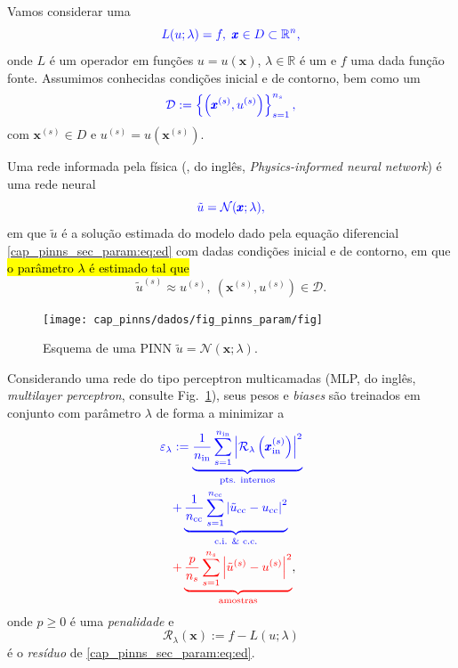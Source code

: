 Vamos considerar uma 
\begin{equation}\label{cap_pinns_sec_param:eq:ed}\color{blue}L(u;\lambda) = f, ~\pmb{x}\in D\subset\mathbb{R}^n,
\end{equation}
onde $L$ é um operador em funções $u = u(\pmb{x})$, $\lambda\in\mathbb{R}$ é um  e $f$ uma dada função fonte. Assumimos conhecidas condições inicial e de contorno, bem como um 
\begin{equation}\color{blue}\mathcal{D} := \left\{\left(\pmb{x}^{(s)},u^{(s)}\right)\right\}_{s=1}^{n_s},
\end{equation}
com $\pmb{x}^{(s)}\in D$ e $u^{(s)} = u\left(\pmb{x}^{(s)}\right)$.

Uma rede informada pela física (, do inglês, \textit{Physics-informed neural network})  é uma rede neural
\begin{equation}\color{blue}\tilde{u} = \mathcal{N}(\pmb{x};\lambda),
\end{equation}
em que $\tilde{u}$ é a solução estimada do modelo dado pela equação diferencial \eqref{cap_pinns_sec_param:eq:ed} com dadas condições inicial e de contorno, em que \hl{o parâmetro $\lambda$ é estimado tal que}
\begin{equation}
  \tilde{u}^{(s)} \approx u^{(s)}, ~\left(\pmb{x}^{(s)},u^{(s)}
\right)\in\mathcal{D}.
\end{equation}

\begin{figure}[H]
  \centering
  \texttt{[image: cap\_pinns/dados/fig\_pinns\_param/fig]}
  \caption{Esquema de uma PINN $\tilde{u} = \mathcal{N}(\pmb{x};\lambda)$.}
  \label{cap_pinns_sec_param:fig:pinn}
\end{figure}

Considerando uma rede do tipo perceptron multicamadas (MLP, do inglês, \textit{multilayer perceptron}, consulte Fig.~\ref{cap_pinns_sec_param:fig:pinn}), seus pesos e \textit{biases} são treinados em conjunto com parâmetro $\lambda$ de forma a minimizar a 
\begin{equation}
  \begin{aligned}
    &{\color{blue}\varepsilon_\lambda := \underbrace{\frac{1}{n_{\text{in}}}\sum_{s=1}^{n_{\text{in}}}\left|\mathcal{R}_\lambda\left(\pmb{x}_{\text{in}}^{(s)}\right)\right|^2}_{\text{pts. internos}}}\\
    &{\color{blue}\quad + \underbrace{\frac{1}{n_{\text{cc}}}\sum_{s=1}^{n_{\text{cc}}}\left|\tilde{u}_{\text{cc}}-u_{\text{cc}}\right|^2}_{\text{c.i. \& c.c.}}}\\
    &{\color{red}\quad + \underbrace{\frac{p}{n_s}\sum_{s=1}^{n_s}\left|\tilde{u}^{(s)}-u^{(s)}\right|^2}_{\text{amostras}}},
  \end{aligned}
\end{equation}
onde $p\geq 0$ é uma \emph{penalidade} e
\begin{equation}
  \mathcal{R}_\lambda(\pmb{x}) := f - L(u;\lambda)
\end{equation}
é o \emph{resíduo} de \eqref{cap_pinns_sec_param:eq:ed}.

